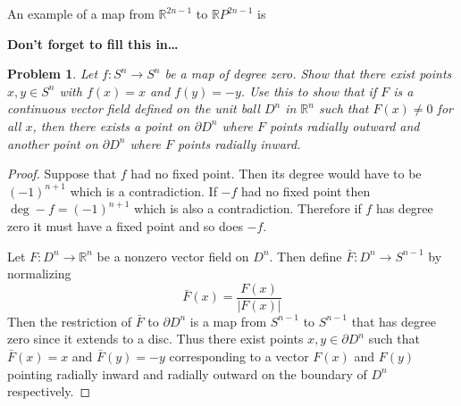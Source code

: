 \documentclass[10pt]{article}
\newcommand{\sk}{\vskip 10mm}
\newcommand{\bb}[1]{\mathbb{#1}}
\theoremstyle{plain}
\newtheorem{problem}{Problem}
\theoremstyle{remark}
\begin{document}
An example of a map from $\bb{R}^{2n-1}$ to $\bb{R}P^{2n-1}$ is

\textbf{Don't forget to fill this in\ldots}

\sk

\begin{problem}
  Let $f:S^n\rightarrow S^n$ be a map of degree zero. Show that there exist
  points $x,y\in S^n$ with $f(x)=x$ and $f(y)=-y$. Use this to show
  that if $F$ is a continuous vector field defined on the unit
  ball $D^n$ in $\bb{R}^n$ such that $F(x)\neq 0$ for all $x$, then
  there exists a point on $\partial D^n$ where $F$ points radially outward
  and another point on $\partial D^n$ where $F$ points radially inward.
\end{problem}

\begin{proof}
  Suppose that $f$ had no fixed point. Then its degree would have to be
  $(-1)^{n+1}$ which is a contradiction. If $-f$ had no fixed point then
  $\deg -f=(-1)^{n+1}$ which is also a contradiction. Therefore if $f$
  has degree zero it must have a fixed point and so does $-f$.

  Let $F:D^n\rightarrow\bb{R}^n$ be a nonzero vector field on $D^n$. Then define
  $\bar{F}:D^n\rightarrow S^{n-1}$ by normalizing
  \[
    \bar{F}(x)=\frac{F(x)}{|F(x)|}
  \]
  Then the restriction of $\bar{F}$ to $\partial D^n$ is a map from $S^{n-1}$
  to $S^{n-1}$ that has degree zero since it extends to a disc. Thus
  there exist points $x,y\in \partial D^n$ such that $\bar{F}(x)=x$ and $\bar{F}(y)=-y$
  corresponding to a vector $F(x)$ and $F(y)$ pointing radially inward and
  radially outward on the boundary of $D^n$ respectively.
\end{proof}

\end{document}
